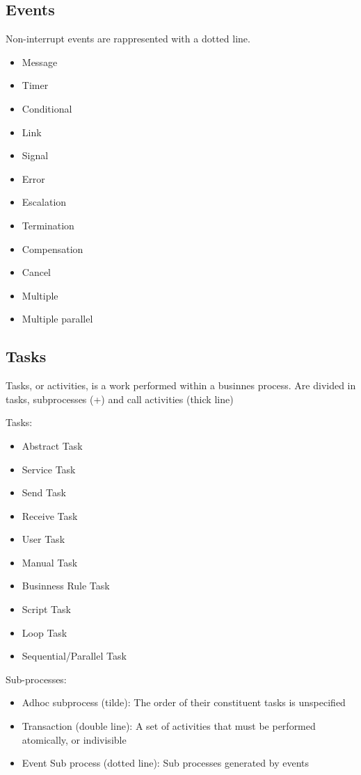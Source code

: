 \documentclass[12pt, a4paper]{article}
\begin{document}
\subsection{Events}
Non-interrupt events are rappresented with a dotted line.
\begin{itemize}
    \item Message 
    \item Timer 
    \item Conditional 
    \item Link 
    \item Signal 
    \item Error 
    \item Escalation 
    \item Termination 
    \item Compensation 
    \item Cancel 
    \item Multiple 
    \item Multiple parallel 
\end{itemize}

\subsection{Tasks}
Tasks, or activities, is a work performed within a businnes process. Are divided in tasks, subprocesses (+)
and call activities (thick line)

Tasks:
\begin{itemize}
    \item Abstract Task 
    \item Service Task 
    \item Send Task 
    \item Receive Task 
    \item User Task 
    \item Manual Task 
    \item Businness Rule Task
    \item Script Task 
    \item Loop Task 
    \item Sequential/Parallel Task
\end{itemize}

Sub-processes:
\begin{itemize}
    \item Adhoc subprocess (tilde): The order of their constituent tasks is unspecified
    \item Transaction (double line): A set of activities that must be performed atomically, or indivisible
    \item Event Sub process (dotted line): Sub processes generated by events
\end{itemize}
\end{document}
